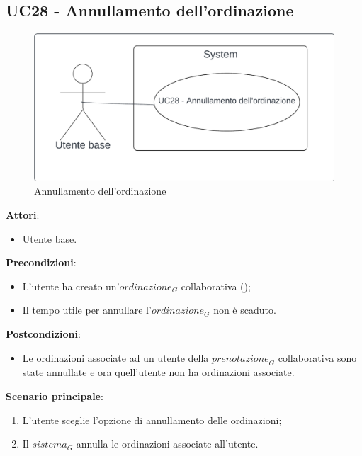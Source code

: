 \subsection{UC28 - Annullamento dell'ordinazione}\label{usecase:28}
\begin{figure}[H]
    \centering
    \includegraphics[width=0.9\linewidth]{ucd/UCD28.png}
    \caption{Annullamento dell'ordinazione}
\end{figure}
\textbf{Attori}:
\begin{itemize}
    \item Utente base.
\end{itemize}
\textbf{Precondizioni}:
\begin{itemize}
    \item L'utente ha creato un'$\textit{ordinazione}_G$ collaborativa ();
    \item Il tempo utile per annullare l'$\textit{ordinazione}_G$ non è scaduto.
\end{itemize}
\textbf{Postcondizioni}:
\begin{itemize}
    \item Le ordinazioni associate ad un utente della $\textit{prenotazione}_G$ collaborativa sono state annullate e ora quell'utente non ha ordinazioni associate.
\end{itemize}
\textbf{Scenario principale}:
\begin{enumerate}
    \item L'utente sceglie l'opzione di annullamento delle ordinazioni;
    \item Il $\textit{sistema}_G$ annulla le ordinazioni associate all'utente.
\end{enumerate}
\newpage